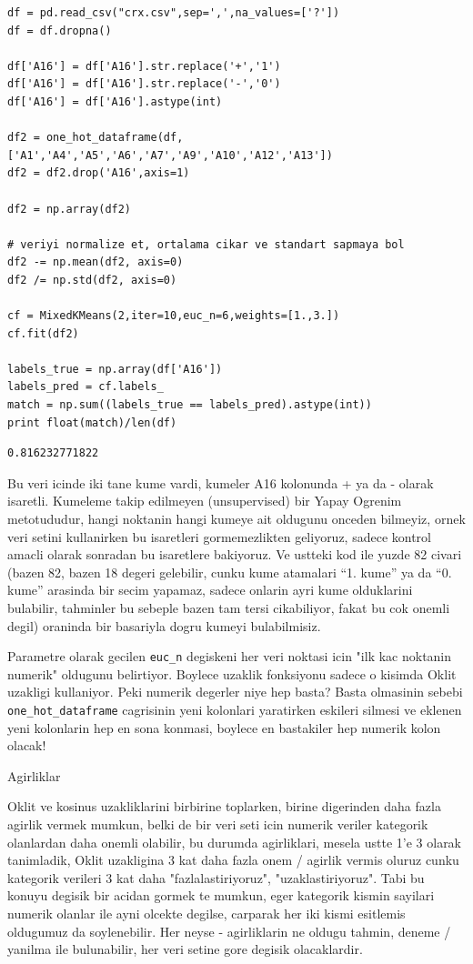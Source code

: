 \documentclass[12pt,fleqn]{article}\usepackage{../common}
\begin{document}
\begin{verbatim}
df = pd.read_csv("crx.csv",sep=',',na_values=['?'])
df = df.dropna()

df['A16'] = df['A16'].str.replace('+','1')
df['A16'] = df['A16'].str.replace('-','0')
df['A16'] = df['A16'].astype(int)

df2 = one_hot_dataframe(df,['A1','A4','A5','A6','A7','A9','A10','A12','A13'])
df2 = df2.drop('A16',axis=1)

df2 = np.array(df2)

# veriyi normalize et, ortalama cikar ve standart sapmaya bol
df2 -= np.mean(df2, axis=0)
df2 /= np.std(df2, axis=0)

cf = MixedKMeans(2,iter=10,euc_n=6,weights=[1.,3.])
cf.fit(df2)

labels_true = np.array(df['A16'])
labels_pred = cf.labels_
match = np.sum((labels_true == labels_pred).astype(int))
print float(match)/len(df)
\end{verbatim}

\begin{verbatim}
0.816232771822
\end{verbatim}

Bu veri icinde iki tane kume vardi, kumeler A16 kolonunda + ya da - olarak
isaretli. Kumeleme takip edilmeyen (unsupervised) bir Yapay Ogrenim
metotududur, hangi noktanin hangi kumeye ait oldugunu onceden bilmeyiz,
ornek veri setini kullanirken bu isaretleri gormemezlikten geliyoruz,
sadece kontrol amacli olarak sonradan bu isaretlere bakiyoruz. Ve ustteki
kod ile yuzde 82 civari (bazen 82, bazen 18 degeri gelebilir, cunku kume
atamalari ``1. kume'' ya da ``0. kume'' arasinda bir secim yapamaz, sadece
onlarin ayri kume olduklarini bulabilir, tahminler bu sebeple bazen tam
tersi cikabiliyor, fakat bu cok onemli degil) oraninda bir basariyla dogru
kumeyi bulabilmisiz.

Parametre olarak gecilen \verb!euc_n! degiskeni her veri noktasi icin "ilk
kac noktanin numerik" oldugunu belirtiyor. Boylece uzaklik fonksiyonu
sadece o kisimda Oklit uzakligi kullaniyor. Peki numerik degerler niye hep
basta?  Basta olmasinin sebebi \verb!one_hot_dataframe! cagrisinin yeni
kolonlari yaratirken eskileri silmesi ve eklenen yeni kolonlarin hep en
sona konmasi, boylece en bastakiler hep numerik kolon olacak!

Agirliklar

Oklit ve kosinus uzakliklarini birbirine toplarken, birine digerinden
daha fazla agirlik vermek mumkun, belki de bir veri seti icin numerik
veriler kategorik olanlardan daha onemli olabilir, bu durumda
agirliklari, mesela ustte 1'e 3 olarak tanimladik, Oklit uzakligina 3
kat daha fazla onem / agirlik vermis oluruz cunku kategorik verileri 3
kat daha "fazlalastiriyoruz", "uzaklastiriyoruz". Tabi bu konuyu
degisik bir acidan gormek te mumkun, eger kategorik kismin sayilari
numerik olanlar ile ayni olcekte degilse, carparak her iki kismi
esitlemis oldugumuz da soylenebilir. Her neyse - agirliklarin ne
oldugu tahmin, deneme / yanilma ile bulunabilir, her veri setine gore
degisik olacaklardir.
\end{document}
